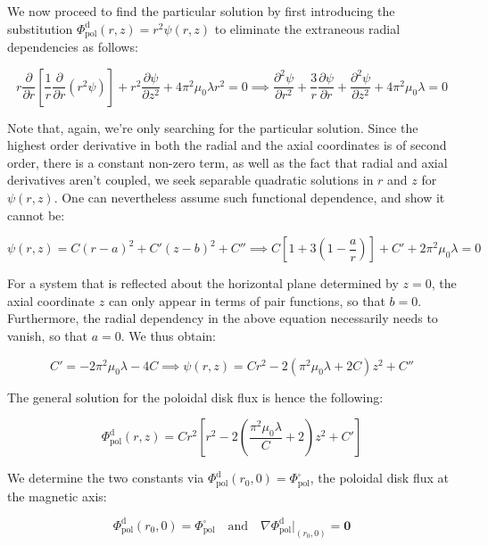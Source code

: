 \quad We now proceed to find the particular solution by first introducing the substitution $\Phi_\text{pol}^\mathrm{d}(r,z)=r^2\psi(r,z)$ to eliminate the extraneous radial dependencies as follows:

\begin{equation}
    r\frac{\partial}{\partial r}\left[\frac{1}{r}\frac{\partial}{\partial r}\left(r^2\psi\right)\right]+r^2\frac{\partial\psi}{\partial z^2}+4\pi^2\mu_0\lambda r^2=0\implies
    \frac{\partial^2\psi}{\partial r^2}+\frac{3}{r}\frac{\partial\psi}{\partial r}+\frac{\partial^2\psi}{\partial z^2}+4\pi^2\mu_0\lambda=0
\end{equation}

Note that, again, we're only searching for the particular solution. Since the highest order derivative in both the radial and the axial coordinates is of second order, there is a constant non-zero term, as well as the fact that radial and axial derivatives aren't coupled, we seek separable quadratic solutions in $r$ and $z$ for $\psi(r,z)$. One can nevertheless assume such functional dependence, and show it cannot be:

\begin{equation}
    \psi(r,z)=C(r-a)^2+C'(z-b)^2+C''\implies C\left[1+3\left(1-\frac{a}{r}\right)\right]+C'+2\pi^2\mu_0\lambda=0 
\end{equation}

For a system that is reflected about the horizontal plane determined by $z=0$, the axial coordinate $z$ can only appear in terms of pair functions, so that $b=0$. Furthermore, the radial dependency in the above equation necessarily needs to vanish, so that $a=0$. We thus obtain:

\begin{equation}
    C'=-2\pi^2\mu_0\lambda-4C\implies\psi(r,z)=Cr^2-2\left(\pi^2\mu_0\lambda+2C\right)z^2+C''
\end{equation}

The general solution for the poloidal disk flux is hence the following:

\begin{equation}
    \Phi_\text{pol}^\mathrm{d}(r,z)=Cr^2\left[r^2-2\left(\frac{\pi^2\mu_0\lambda}{C}+2\right)z^2+C'\right]
\end{equation}

We determine the two constants via $\Phi_\text{pol}^\mathrm{d}(r_0,0)=\Phi_\text{pol}^{\square}$, the poloidal disk flux at the magnetic axis:

\begin{equation}
    \Phi_\text{pol}^\mathrm{d}(r_0,0)=\Phi_\text{pol}^\square\quad\text{and}\quad\nabla\Phi_\text{pol}^\mathrm{d}\Bigr|_{(r_0,0)}=\mathbf{0}
\end{equation}

